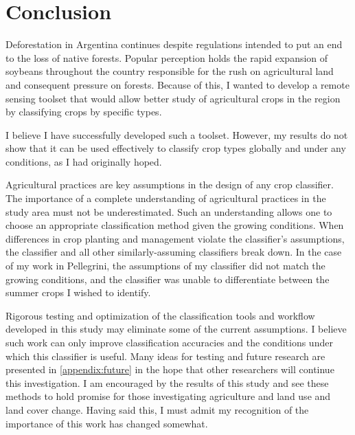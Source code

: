 \chapter{Conclusion}
\label{conclusion}


Deforestation in Argentina continues despite regulations intended to put an end to the loss of native forests. Popular perception holds the rapid expansion of soybeans throughout the country responsible for the rush on agricultural land and consequent pressure on forests. Because of this, I wanted to develop a remote sensing toolset that would allow better study of agricultural crops in the region by classifying crops by specific types.

I believe I have successfully developed such a toolset. However, my results do not show that it can be used effectively to classify crop types globally and under any conditions, as I had originally hoped.

Agricultural practices are key assumptions in the design of any crop classifier. The importance of a complete understanding of agricultural practices in the study area must not be underestimated. Such an understanding allows one to choose an appropriate classification method given the growing conditions. When differences in crop planting and management violate the classifier's assumptions, the classifier and all other similarly-assuming classifiers break down. In the case of my work in Pellegrini, the assumptions of my classifier did not match the growing conditions, and the classifier was unable to differentiate between the summer crops I wished to identify.

Rigorous testing and optimization of the classification tools and workflow developed in this study may eliminate some of the current assumptions. I believe such work can only improve classification accuracies and the conditions under which this classifier is useful.  Many ideas for testing and future research are presented in \autoref{appendix:future} in the hope that other researchers will continue this investigation. I am encouraged by the results of this study and see these methods to hold promise for those investigating agriculture and land use and land cover change. Having said this, I must admit my recognition of the importance of this work has changed somewhat.

